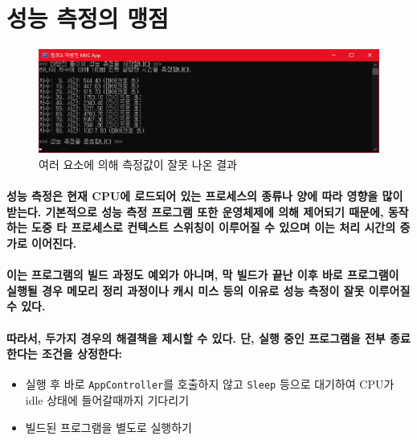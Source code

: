\documentclass[UTF8]{report}
\begin{document}
        \section{성능 측정의 맹점}
            \begin{figure}[h]
                \centering
                \includegraphics[width=\textwidth]{test_result_wrong_with_debugger.png}
                \caption{여러 요소에 의해 측정값이 잘못 나온 결과}
                \label{}
            \end{figure}    
            
            \paragraph{%
                \normalfont 성능 측정은 현재 CPU에 로드되어 있는 프로세스의 종류나 양에 따라 영향을 많이 받는다. 기본적으로 성능 측정 프로그램 또한 운영체제에 의해 제어되기 때문에, 동작하는 도중 타 프로세스로 컨텍스트 스위칭이 이루어질 수 있으며 이는 처리 시간의 증가로 이어진다.
            }

            \paragraph{%
                \normalfont 이는 프로그램의 빌드 과정도 예외가 아니며, 막 빌드가 끝난 이후 바로 프로그램이 실행될 경우 메모리 정리 과정이나 캐시 미스 등의 이유로 성능 측정이 잘못 이루어질 수 있다. 
            }

            \paragraph{%
                \normalfont 따라서, 두가지 경우의 해결책을 제시할 수 있다. 단, 실행 중인 프로그램을 전부 종료한다는 조건을 상정한다: 
            }
            
            \begin{itemize}
                \item 실행 후 바로 \texttt{AppController}를 호출하지 않고 \texttt{Sleep} 등으로 대기하여 CPU가 idle 상태에 들어갈때까지 기다리기
                \item 빌드된 프로그램을 별도로 실행하기
            \end{itemize}
\end{document}

